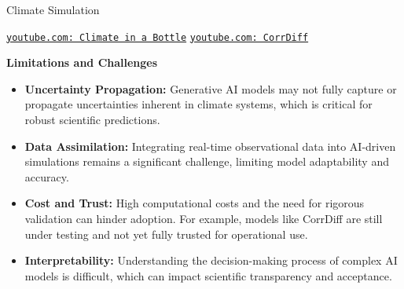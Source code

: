 \begin{frame}[allowframebreaks]{Climate Simulation}
    \begin{center}
        \href{https://www.youtube.com/results?search_query=climate+in+a+bottle}{\texttt{youtube.com: Climate in a Bottle}}
        \hspace{1cm}
        \href{https://www.youtube.com/results?search_query=CorrDiff}{\texttt{youtube.com: CorrDiff}}
    \end{center}

    \framebreak

    \textbf{Limitations and Challenges}

    \begin{itemize}
        \item \textbf{Uncertainty Propagation:} Generative AI models may not fully capture or propagate uncertainties inherent in climate systems, which is critical for robust scientific predictions.
        \item \textbf{Data Assimilation:} Integrating real-time observational data into AI-driven simulations remains a significant challenge, limiting model adaptability and accuracy.
        \item \textbf{Cost and Trust:} High computational costs and the need for rigorous validation can hinder adoption. For example, models like CorrDiff are still under testing and not yet fully trusted for operational use.
        \item \textbf{Interpretability:} Understanding the decision-making process of complex AI models is difficult, which can impact scientific transparency and acceptance.
    \end{itemize}

\end{frame}